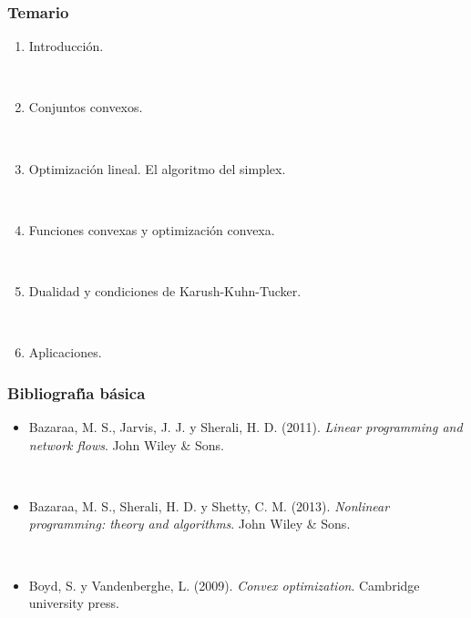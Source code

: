 \documentclass{beamer}
\begin{document}
\begin{frame}[plain]
\frametitle{Temario}

\begin{enumerate}

\item Introducción.


\

\item Conjuntos convexos.

\



\item Optimización lineal. El algoritmo del simplex.



\


\item Funciones convexas y optimización convexa.

\

\item  Dualidad y condiciones de Karush-Kuhn-Tucker.

\

\item Aplicaciones.



\end{enumerate}



\end{frame}
\begin{frame}[plain]
\frametitle{Bibliograf\'{\i}a básica}

\begin{itemize}



\item Bazaraa, M. S., Jarvis, J. J. y Sherali, H. D. (2011). \textit{Linear programming and network flows}. John Wiley \& Sons.

\

\item Bazaraa, M. S., Sherali, H. D. y Shetty, C. M. (2013). \textit{Nonlinear programming: theory and algorithms}. John Wiley \& Sons.

\

\item Boyd, S. y Vandenberghe, L. (2009). \textit{Convex optimization}. Cambridge university press.




\end{itemize}




\end{frame}
\end{document}
